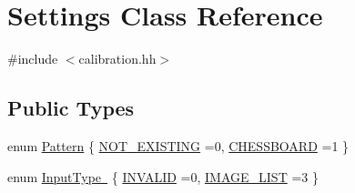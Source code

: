 \hypertarget{class_settings}{}\section{Settings Class Reference}
\label{class_settings}


{\ttfamily \#include $<$calibration.\+hh$>$}

\subsection*{Public Types}
\begin{DoxyCompactItemize}
\item 
enum \mbox{\hyperlink{class_settings_a0e7117abd9427a6f8bc1d1d8d456b5c8}{Pattern}} \{ \mbox{\hyperlink{class_settings_a0e7117abd9427a6f8bc1d1d8d456b5c8ad2f421ce100bd7e0302b17bda1a74eb9}{N\+O\+T\+\_\+\+E\+X\+I\+S\+T\+I\+NG}} =0, 
\mbox{\hyperlink{class_settings_a0e7117abd9427a6f8bc1d1d8d456b5c8ae96aa2d60b4a554a215524a05b32908e}{C\+H\+E\+S\+S\+B\+O\+A\+RD}} =1
 \}
\item 
enum \mbox{\hyperlink{class_settings_a04fa2d41ea944f16221959d0d49858e9}{Input\+Type }} \{ \mbox{\hyperlink{class_settings_a04fa2d41ea944f16221959d0d49858e9adb44130895aedc32a119565eb6d61bed}{I\+N\+V\+A\+L\+ID}} =0, 
\mbox{\hyperlink{class_settings_a04fa2d41ea944f16221959d0d49858e9a292bd2e5ba912a92ace1606e366edc4d}{I\+M\+A\+G\+E\+\_\+\+L\+I\+ST}} =3
 \}
\end{DoxyCompactItemize}
